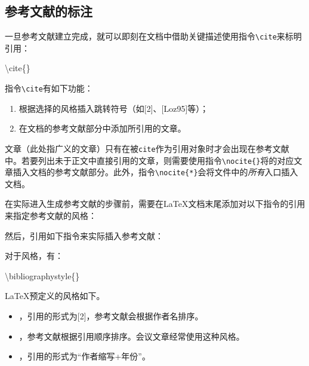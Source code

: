 \subsection{参考文献的标注}

一旦参考文献建立完成，就可以即刻在文档中借助关键描述使用指令\verb|\cite|来标明引用：

\begin{dmd}
\backslash cite\{\}
\end{dmd}

指令\verb|\cite|有如下功能：

\begin{enumerate}
    \item 根据选择的风格插入跳转符号（如[2]、[Loz95]等）；
    \item 在文档的参考文献部分中添加所引用的文章。
\end{enumerate}

\begin{ii}
    文章（此处指广义的文章）只有在被\verb|cite|作为引用对象时才会出现在参考文献中。若要列出未于正文中直接引用的文章，则需要使用指令\verb|\nocite{|\verb|}|将的对应文章插入文档的参考文献部分。此外，指令\verb|\nocite{*}|会将文件中的\emph{所有}入口插入文档。
\end{ii}

在实际进入生成参考文献的步骤前，需要在\LaTeX 文档末尾添加对以下指令的引用来指定参考文献的风格：

\begin{dmd}
\verb||
\end{dmd}

然后，引用如下指令来实际插入参考文献：

\begin{dmd}
\verb||
\end{dmd}

对于风格，有：

\begin{dmd}
\backslash bibliographystyle\{\}
\end{dmd}

\LaTeX 预定义的风格如下。

\begin{itemize}
    \item {}，引用的形式为[2]，参考文献会根据作者名排序。
    \item {}，参考文献根据引用顺序排序。会议文章经常使用这种风格。
    \item {}，引用的形式为``作者缩写+年份''。
\end{itemize}

